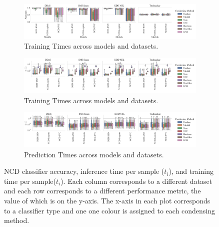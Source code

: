 \documentclass[conference]{IEEEtran}
\begin{document}
\begin{figure}[htb]
    \begin{subfigure}[htb]{\textwidth}
        \centering
        \includegraphics[width=\textwidth]{figs/combined/condensing_methods_vs_accuracy.pdf}
        \caption{Training Times across models and datasets.}
        \label{fig:condense_acc}
    \end{subfigure}
    \begin{subfigure}[htb]{\textwidth}
        \centering
        \includegraphics[width=\textwidth]{figs/combined/condensing_methods_vs_train_time.pdf}
        \caption{Training Times across models and datasets.}
        \label{fig:condense_train_time}
    \end{subfigure}
    \begin{subfigure}[htb]{\textwidth}
        \includegraphics[width=\textwidth]{figs/combined/condensing_methods_vs_predict_time.pdf}
        \caption{Prediction Times across models and datasets.}
        \label{fig:condense_pred_time}
    \end{subfigure}
    \caption{NCD classifier accuracy, inference time per sample ($t_i$), and training time per sample($t_i$). 
    Each column corresponds to a different dataset and each row corresponds to a different performance metric, the value of which is on the y-axis. 
    The x-axis in each plot corresponds to a classifier type and one one colour is assigned to each condensing method.}
    \label{fig:condense_summary}
\end{figure}
\end{document}

